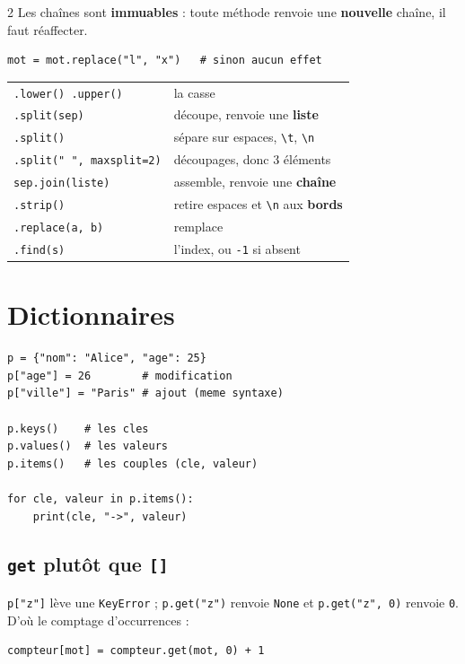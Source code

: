 \documentclass[a4paper,10pt]{article}
\newcommand{\co}[1]{\texttt{\textcolor{codefg}{#1}}}
\begin{document}
\begin{multicols}{2}
Les chaînes sont \textbf{immuables} : toute méthode renvoie une
\textbf{nouvelle} chaîne, il faut réaffecter.

\begin{lstlisting}
mot = mot.replace("l", "x")   # sinon aucun effet
\end{lstlisting}

\begin{tabularx}{\linewidth}{@{}l>{\raggedright\arraybackslash}X@{}}
\toprule
\co{.lower() .upper()} & la casse \\
\co{.split(sep)} & découpe, renvoie une \textbf{liste} \\
\co{.split()} & sépare sur espaces, \co{\textbackslash t}, \co{\textbackslash n} \\
\co{.split(" ", maxsplit=2)} & 2 découpages, donc 3 éléments \\
\co{sep.join(liste)} & assemble, renvoie une \textbf{chaîne} \\
\co{.strip()} & retire espaces et \co{\textbackslash n} aux \textbf{bords} \\
\co{.replace(a, b)} & remplace \\
\co{.find(s)} & l'index, ou \co{-1} si absent \\
\bottomrule
\end{tabularx}

\section{Dictionnaires}

\begin{lstlisting}
p = {"nom": "Alice", "age": 25}
p["age"] = 26        # modification
p["ville"] = "Paris" # ajout (meme syntaxe)

p.keys()    # les cles
p.values()  # les valeurs
p.items()   # les couples (cle, valeur)

for cle, valeur in p.items():
    print(cle, "->", valeur)
\end{lstlisting}

\subsection{\co{get} plutôt que \co{[]}}
\co{p["z"]} lève une \co{KeyError} ; \co{p.get("z")} renvoie \co{None} et
\co{p.get("z", 0)} renvoie \co{0}. D'où le comptage d'occurrences :

\begin{lstlisting}
compteur[mot] = compteur.get(mot, 0) + 1
\end{lstlisting}


\end{multicols}
\end{document}
